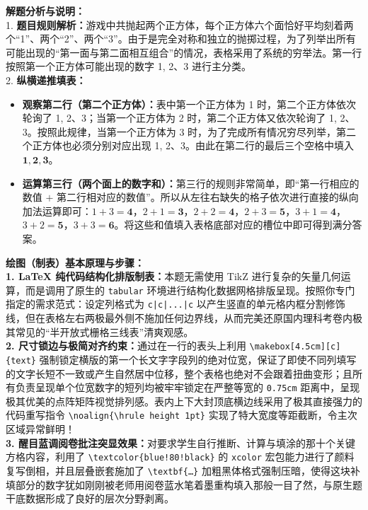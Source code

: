 {\small\color{gray}
\textbf{解题分析与说明：}\\
1. \textbf{题目规则解析：}游戏中共抛起两个正方体，每个正方体六个面恰好平均刻着两个“1”、两个“2”、两个“3”。由于是完全对称和独立的抛掷过程，为了列举出所有可能出现的“第一面与第二面相互组合”的情况，表格采用了系统的穷举法。第一行按照第一个正方体可能出现的数字 1, 2$、$3 进行主分类。\\
2. \textbf{纵横递推填表：}
\begin{itemize}
    \item \textbf{观察第二行（第二个正方体）：}表中第一个正方体为 1 时，第二个正方体依次轮询了 1, 2、3；当第一个正方体为 2 时，第二个正方体又依次轮询了 1, 2、3。按照此规律，当第一个正方体为 3 时，为了完成所有情况穷尽列举，第二个正方体也必须分别对应出现 1, 2$、$3。由此在第二行的最后三个空格中填入 $\boldsymbol{1, 2, 3}$。
    \item \textbf{运算第三行（两个面上的数字和）：}第三行的规则非常简单，即“第一行相应的数值 $+$ 第二行相对应的数值”。所以从左往右缺失的格子依次进行直接的纵向加法运算即可：$1+3=\boldsymbol{4}$，$2+1=\boldsymbol{3}$，$2+2=\boldsymbol{4}$，$2+3=\boldsymbol{5}$，$3+1=\boldsymbol{4}$，$3+2=\boldsymbol{5}$，$3+3=\boldsymbol{6}$。将这些和值填入表格底部对应的槽位中即可得到满分答案。
\end{itemize}
}

\vspace{0.6cm}

{\small\color{blue!70!black}
\textbf{绘图（制表）基本原理与步骤：}\\
\textbf{1. LaTeX 纯代码结构化排版制表：}本题无需使用 TikZ 进行复杂的矢量几何运算，而是调用了原生的 \texttt{tabular} 环境进行结构化数据网格排版呈现。按照你专门指定的需求范式：设定列格式为 \texttt{c|c|...|c} 以产生竖直的单元格内框分割修饰线，但在表格左右两极最外侧不施加任何边界线，从而完美还原国内理科考卷内极其常见的“半开放式栅格三线表”清爽观感。\\
\textbf{2. 尺寸锁边与极简对齐约束：}通过在一行的表头上利用 \texttt{\textbackslash makebox[4.5cm][c]\{text\}} 强制锁定横版的第一个长文字字段列的绝对位宽，保证了即使不同列填写的文字长短不一致或产生自然居中位移，整个表格也绝对不会跟着扭曲变形；且所有负责呈现单个位宽数字的短列均被牢牢锁定在严整等宽的 \texttt{0.75cm} 距离中，呈现极其优美的点阵矩阵视觉排列感。表内上下大封顶底横边线采用了极其直接强力的代码重写指令 \texttt{\textbackslash noalign\{\textbackslash hrule height 1pt\}} 实现了特大宽度等距截断，令主次区域异常鲜明！\\
\textbf{3. 醒目蓝调阅卷批注突显效果：}对要求学生自行推断、计算与填涂的那十个关键方格内容，利用了 \texttt{\textbackslash textcolor\{blue!80!black\}} 的 \texttt{xcolor} 宏包能力进行了颜料复写倒相，并且层叠嵌套施加了 \texttt{\textbackslash textbf\{\dots\}} 加粗黑体格式强制压暗，使得这块补填部分的数字犹如刚刚被老师用阅卷蓝水笔着墨重构填入那般一目了然，与原生题干底数据形成了良好的层次分野剥离。
}

